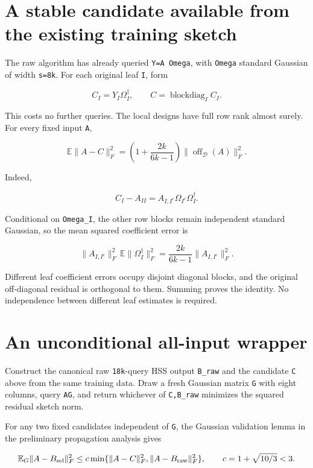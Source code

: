 \documentclass[11pt,oneside,openany,a4paper]{book}
\numberwithin{equation}{chapter}
\theoremstyle{definition}
\theoremstyle{remark}
\begin{document}
\section{A stable candidate available from the existing training sketch}\label{fallback:a-stable-candidate-available-from-the-existing-training-sketch}

The raw algorithm has already queried \texttt{Y=A\ Omega}, with \texttt{Omega} standard Gaussian of width \texttt{s=8k}. For each original leaf \texttt{I}, form

\[
 C_I=Y_I\Omega_I^\dagger,
 \qquad C=\operatorname{blockdiag}_I C_I.
\]

This costs no further queries. The local designs have full row rank almost surely. For every fixed input \texttt{A},

\[
 \boxed{\quad
 \mathbb E\|A-C\|_F^2
 =\left(1+\frac{2k}{6k-1}\right)
       \|\operatorname{off}_{\mathcal D}(A)\|_F^2.
 \quad}
\]

Indeed,

\[
 C_I-A_{II}=A_{I,I^c}\Omega_{I^c}\Omega_I^\dagger.
\]

Conditional on \texttt{Omega\_I}, the other row blocks remain independent standard Gaussian, so the mean squared coefficient error is

\[
 \|A_{I,I^c}\|_F^2\,\mathbb E\|\Omega_I^\dagger\|_F^2
 =\frac{2k}{6k-1}\|A_{I,I^c}\|_F^2.
\]

Different leaf coefficient errors occupy disjoint diagonal blocks, and the original off-diagonal residual is orthogonal to them. Summing proves the identity. No independence between different leaf estimates is required.

\section{An unconditional all-input wrapper}\label{fallback:an-unconditional-all-input-wrapper}

Construct the canonical raw \texttt{18k}-query HSS output \texttt{B\_raw} and the candidate \texttt{C} above from the same training data. Draw a fresh Gaussian matrix \texttt{G} with eight columns, query \texttt{AG}, and return whichever of \texttt{C,B\_raw} minimizes the squared residual sketch norm.

For any two fixed candidates independent of \texttt{G}, the Gaussian validation lemma in the preliminary propagation analysis gives

\[
 \mathbb E_G\|A-B_{\rm sel}\|_F^2
 \le c\min\{\|A-C\|_F^2,\|A-B_{\rm raw}\|_F^2\},
 \qquad c=1+\sqrt{10/3}<3.
\]
\end{document}
